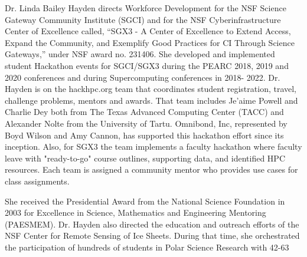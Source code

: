 \documentclass{ieeeaccess}
\begin{document}
\begin{IEEEbiography}
{Dr. Linda Bailey Hayden} directs Workforce Development for the NSF Science Gateway Community Institute (SGCI) and for the NSF Cyberinfrastructure Center of Excellence called, “SGX3 - A Center of Excellence to Extend Access, Expand the Community, and Exemplify Good Practices for CI Through Science Gateways,” under NSF award no. 231406. She developed and implemented student Hackathon events for SGCI/SGX3 during the PEARC 2018, 2019 and 2020 conferences and during Supercomputing conferences in 2018- 2022. Dr. Hayden is on the hackhpc.org team that coordinates student registration, travel, challenge problems, mentors and awards. That team includes Je’aime Powell and Charlie Dey both from The Texas Advanced Computing Center (TACC) and Alexander Nolte from the University of Tartu. Omnibond, Inc, represented by Boyd Wilson and Amy Cannon, has supported this hackathon effort since its inception. Also, for SGX3 the team implements a faculty hackathon where faculty leave with "ready-to-go" course outlines, supporting data, and identified HPC resources. Each team is assigned a community mentor who provides use cases for class assignments.

She received the Presidential Award from the National Science Foundation in 2003 for Excellence in Science, Mathematics and Engineering Mentoring (PAESMEM). Dr. Hayden also directed the education and outreach efforts of the NSF Center for Remote Sensing of Ice Sheets. During that time, she orchestrated the participation of hundreds of students in Polar Science Research with 42-63%
\end{IEEEbiography}

\EOD
\end{document}
